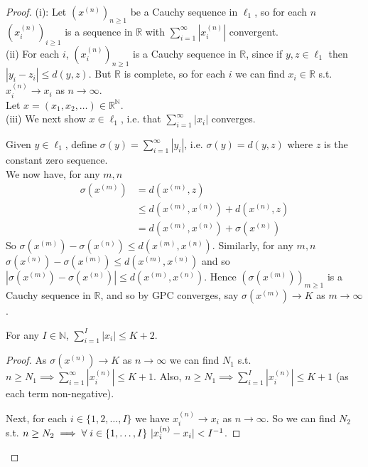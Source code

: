\begin{proof}
    (i): Let $(x^{(n)})_{n \geq 1}$ be a Cauchy sequence in $\ell_1$, so for each $n$ $(x^{(n)}_i)_{i \geq 1}$ is a sequence in $\mathbb{R}$ with $\sum_{i=1}^{\infty} |x_i^{(n)}|$ convergent. \\
    (ii) For each $i$, $(x_i^{(n)})_{n \geq 1}$ is a Cauchy sequence in $\mathbb{R}$, since if $y, z \in \ell_1$ then $|y_i - z_i| \leq d(y, z)$.
    But $\mathbb{R}$ is complete, so for each $i$ we can find $x_i \in \mathbb{R}$ s.t. $x_i^{(n)} \to x_i$ as $n \to \infty$. \\
    Let $x = (x_1, x_2, \dots) \in \mathbb{R}^\mathbb{N}$. \\
    (iii) We next show $x \in \ell_1$, i.e. that $\sum_{i=1}^{\infty} |x_i|$ converges.

    Given $y \in \ell_1$, define $\sigma(y) = \sum_{i=1}^{\infty} |y_i|$, i.e. $\sigma(y) = d(y, z)$ where $z$ is the constant zero sequence. \\
    We now have, for any $m, n$
    \begin{align*}
        \sigma(x^{(m)}) &= d(x^{(m)}, z) \\
        &\leq d(x^{(m)}, x^{(n)}) + d(x^{(n)}, z) \\
        &= d(x^{(m)}, x^{(n)}) + \sigma(x^{(n)}) 
    \end{align*} 
    So $\sigma(x^{(m)}) - \sigma(x^{(n)}) \leq d(x^{(m)}, x^{(n)})$.
    Similarly, for any $m, n$ $\sigma(x^{(n)}) - \sigma(x^{(m)}) \leq d(x^{(m)}, x^{(n)})$ and so $|\sigma(x^{(m)}) - \sigma(x^{(n)})| \leq d(x^{(m)}, x^{(n)})$.
    Hence $(\sigma(x^{(m)}))_{m \geq 1}$ is a Cauchy sequence in $\mathbb{R}$, and so by GPC converges, say $\sigma(x^{(m)}) \to K$ as $m \to \infty$.

    \begin{claim}
        For any $I \in \mathbb{N}$, $\sum_{i=1}^{I} |x_i| \leq K + 2$.
    \end{claim}
    
    \begin{proof}
        As $\sigma(x^{(n)}) \to K$ as $n \to \infty$ we can find $N_1$ s.t. $n \geq N_1 \implies \sum_{i=1}^{\infty} |x_i^{(n)}| \leq K + 1$.
        Also, $n \geq N_1 \implies \sum_{i=1}^{I} |x_i^{(n)}| \leq K + 1$ (as each term non-negative).

        Next, for each $i \in \{1, 2, \dots, I\}$ we have $x_i^{(n)} \to x_i$ as $n \to \infty$.
        So we can find $N_2$ s.t. $n \geq N_2 \implies \forall \; i \in \{1, \dots, I\} \ |x_i^{(n)} - x_i| < I^{-1}$.


\end{proof}
\end{proof}
